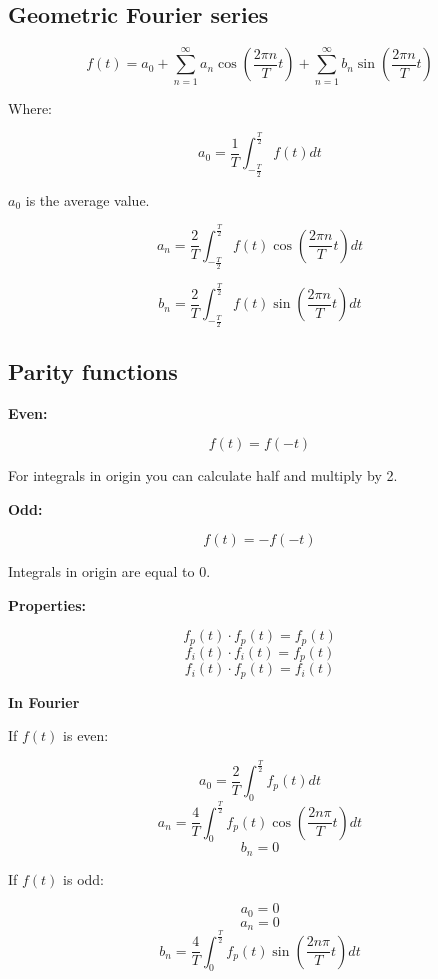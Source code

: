 \documentclass[letterpaper]{article}
\newcommand{\divline}{\noindent\makebox[\linewidth]{\rule{\textwidth}{0.4pt}}}
\begin{document}
        \begin{multicols}{2}

            \section{Geometric Fourier series}

                \[f(t) = a_{0} + \sum_{n = 1}^{\infty} a_{n} \cos{( \frac{2 \pi n}{T} t )} + \sum_{n = 1}^{\infty} b_{n} \sin{( \frac{2 \pi n}{T} t )} \]

                Where:

                \[a_{0} = \frac{1}{T} \int_{-\frac{T}{2}}^{\frac{T}{2}} f(t) dt \]

                \(a_{0}\) is the average value.

                \[a_{n} = \frac{2}{T} \int_{-\frac{T}{2}}^{\frac{T}{2}} f(t) \cos{( \frac{2 \pi n}{T} t )} dt \]

                \[b_{n} = \frac{2}{T} \int_{-\frac{T}{2}}^{\frac{T}{2}} f(t) \sin{( \frac{2 \pi n}{T} t )} dt \]

        \end{multicols}

        \divline

        \begin{multicols}{3}
            \section{Parity functions}
                
                \textbf{Even:}

                \[f(t) = f(-t)\]

                For integrals in origin you can calculate half and multiply by 2.

                \textbf{Odd:}

                \[f(t) = - f(-t)\]

                Integrals in origin are equal to 0.

                \textbf{Properties:}

                \[f_{p}(t) \cdot f_{p}(t) = f_{p}(t)\]
                \[f_{i}(t) \cdot f_{i}(t) = f_{p}(t)\]
                \[f_{i}(t) \cdot f_{p}(t) = f_{i}(t)\]

                \textbf{In Fourier}

                If \(f(t)\) is even:

                \[a_{0} = \frac{2}{T} \int_{0}^{\frac{T}{2}} f_{p}(t) dt \]
                \[a_{n} = \frac{4}{T} \int_{0}^{\frac{T}{2}} f_{p}(t) \cos{(\frac{2 n \pi}{T} t)} dt \]
                \[b_{n} = 0\]

                If \(f(t)\) is odd:

                \[a_{0} = 0\]
                \[a_{n} = 0\]
                \[b_{n} = \frac{4}{T} \int_{0}^{\frac{T}{2}} f_{p}(t) \sin{(\frac{2 n \pi}{T} t)} dt \]
                
        \end{multicols}
\end{document}
